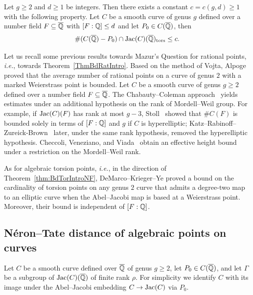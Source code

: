 \begin{theorem}\label{thm:BdTorIntroNF}
  Let $g \ge 2$ and $d \ge 1$ be integers. Then there exists a constant
  $c = c(g, d) \ge 1$ with the following property. Let $C$ be a 
  smooth curve of genus $g$ defined over a
  number field $F\subseteq{\overline{\mathbb{Q}}}$ 
  with $[F:{\mathbb{Q}}] \le d$ and let $P_0 \in C({\overline{\mathbb{Q}}})$, then
  \begin{equation*}
    \# (C(\overline {{\mathbb{Q}}})-P_0) \cap \mathrm{Jac}(C)({\overline{\mathbb{Q}}})_{\mathrm{tors}} \le c.
  \end{equation*}
\end{theorem}

Let us recall some previous results towards Mazur's Question for
rational points, \textit{i.e.}, towards Theorem~\ref{ThmBdRatIntro}.
Based on the method of Vojta, Alpoge~\cite{AlpogeRatPt} proved that
the average number of rational points on a curve of genus $2$ with a
marked Weierstrass point is bounded. Let $C$ be a smooth curve of
genus $g\ge 2$ defined
over a number field $F\subseteq{\overline{\mathbb{Q}}}$. The Chabauty--Coleman
approach~\cite{Chabauty, Coleman:effCha} yields estimates under an additional
hypothesis on the rank of Mordell--Weil group. For example, if
$\mathrm{Jac}(C)(F)$ has rank at most $g-3$, Stoll~\cite{Stoll:Uniform} showed
that $\#C(F)$ is bounded solely in terms of $[F:{\mathbb{Q}}]$ and $g$ if $C$ is
hyperelliptic; Katz--Rabinoff--Zureick-Brown~\cite{KatzRabinoffZB}
later, under the same rank hypothesis, removed the hyperelliptic
hypothesis. Checcoli,
Veneziano, and Viada~\cite{CVV:17} obtain an effective height bound
under a restriction on 
 the Mordell--Weil rank.

As for algebraic torsion points, \textit{i.e.}, in the direction of  Theorem~\ref{thm:BdTorIntroNF}, DeMarco--Krieger--Ye \cite{DeMarcoKriegerYeUniManinMumford} proved a bound on the cardinality of torsion points on any genus $2$
curve that admits a degree-two map to an elliptic curve when the
Abel--Jacobi map is based at a Weierstrass point. Moreover, their bound is
independent of $[F:{\mathbb{Q}}]$.


\subsection{N\'{e}ron--Tate distance of algebraic points on curves}
\label{subsec:ntdist}
Let $C$ be a smooth curve defined over $\overline {{\mathbb{Q}}}$ of genus $g \ge
2$, let $P_0 \in C(\overline {{\mathbb{Q}}})$, and let $\Gamma$ be a subgroup of
$\mathrm{Jac}(C)(\overline {{\mathbb{Q}}})$ of finite rank $\rho$. For simplicity we identify $C$ with its image under the Abel--Jacobi embedding $C \rightarrow \mathrm{Jac}(C)$ via $P_0$. 

